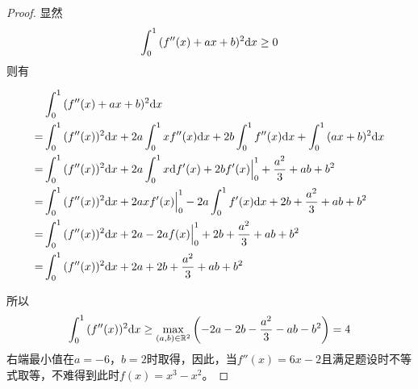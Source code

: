 \begin{proof}

    显然
    $$\int_{0}^{1}{(f''(x) + ax + b)^2}\mathrm{d} x \geq 0$$
    则有

    \begin{align*}
        & \int_{0}^{1}{(f''(x) + ax + b)^2}\mathrm{d} x \\
        = & \int_{0}^{1}{(f''(x))^2}\mathrm{d} x + 2a \int_{0}^{1}{xf''(x)}\mathrm{d} x + 2b \int_{0}^{1}{f''(x)}\mathrm{d} x + \int_{0}^{1}{(ax + b)^2}\mathrm{d} x \\
        = & \int_{0}^{1}{(f''(x))^2}\mathrm{d} x + 2a \int_{0}^{1}{x}\mathrm{d} f'(x) + 2b f'(x) \Big|_{0}^{1} + \dfrac{a^2}{3} + ab + b^2 \\
        = & \int_{0}^{1}{(f''(x))^2}\mathrm{d} x + 2a xf'(x)\Big|_{0}^{1} - 2a \int_{0}^{1}{f'(x)}\mathrm{d} x + 2b + \dfrac{a^2}{3} + ab + b^2 \\
        = & \int_{0}^{1}{(f''(x))^2}\mathrm{d} x + 2a - 2af(x)\Big|_{0}^{1} + 2b + \dfrac{a^2}{3} + ab + b^2 \\
        = & \int_{0}^{1}{(f''(x))^2}\mathrm{d} x + 2a + 2b + \dfrac{a^2}{3} + ab + b^2
    \end{align*}

    所以
    $$\int_{0}^{1}{(f''(x))^2}\mathrm{d} x \geq \max_{(a,b) \in \mathbb{R}^2}\left(-2a - 2b - \dfrac{a^2}{3} - ab - b^2 \right) = 4$$
    右端最小值在$a = -6$，$b = 2$时取得，因此，当$f''(x) = 6x - 2$且满足题设时不等式取等，不难得到此时$f(x) = x^3 - x^2$。
    
\end{proof}
